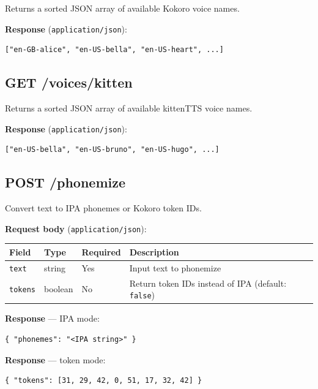 \documentclass[12pt,a4paper]{article}
\begin{document}
Returns a sorted JSON array of available Kokoro voice names.

\textbf{Response} (\texttt{application/json}):

\begin{lstlisting}[language={}]
["en-GB-alice", "en-US-bella", "en-US-heart", ...]
\end{lstlisting}

\subsection{GET /voices/kitten}

Returns a sorted JSON array of available kittenTTS voice names.

\textbf{Response} (\texttt{application/json}):

\begin{lstlisting}[language={}]
["en-US-bella", "en-US-bruno", "en-US-hugo", ...]
\end{lstlisting}

\subsection{POST /phonemize}

Convert text to IPA phonemes or Kokoro token IDs.

\textbf{Request body} (\texttt{application/json}):

\begin{center}
\begin{tabular}{llll}
\toprule
\textbf{Field} & \textbf{Type} & \textbf{Required} & \textbf{Description} \\
\midrule
\texttt{text}   & string  & Yes & Input text to phonemize \\
\texttt{tokens} & boolean & No  & Return token IDs instead of IPA (default: \texttt{false}) \\
\bottomrule
\end{tabular}
\end{center}

\textbf{Response} — IPA mode:

\begin{lstlisting}[language={}]
{ "phonemes": "<IPA string>" }
\end{lstlisting}

\textbf{Response} — token mode:

\begin{lstlisting}[language={}]
{ "tokens": [31, 29, 42, 0, 51, 17, 32, 42] }
\end{lstlisting}
\end{document}
